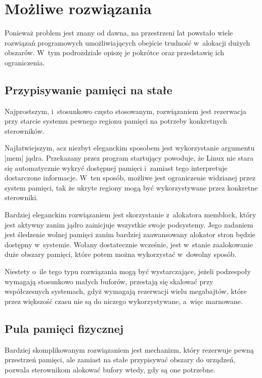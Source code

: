 \section{Możliwe rozwiązania}

Ponieważ problem jest znany od dawna, na przestrzeni lat powstało
wiele rozwiązań programowych umożliwiających obejście trudność
w~alokacji dużych obszarów.  W~tym podrozdziale opiszę je pokrótce
oraz przedstawię ich ograniczenia.

\subsection{Przypisywanie pamięci na stałe}

Najprostszym, i~stosunkowo często stosowanym, rozwiązaniem jest
rezerwacja przy starcie systemu pewnego regionu pamięci na potrzeby
konkretnych sterowników.

Najłatwiejszym, acz niezbyt eleganckim sposobem jest wykorzystanie
argumentu \code|mem| jądra.  Przekazany przez program startujący
powoduje, że Linux nie stara się automatycznie wykryć dostępnej
pamięci  i~zamiast tego interpretuje dostarczone informacje.
W~ten sposób, możliwe jest ograniczenie widzianej przez system
pamięci, tak że ukryte regiony mogą być wykorzystywane przez konkretne
sterowniki.

Bardziej eleganckim rozwiązaniem jest skorzystanie z~alokatora
memblock, który jest aktywny zanim jądro zainicjuje wszystkie swoje
podsystemy.  Jego zadaniem jest śledzenie wolnej pamięci zanim
bardziej zaawansowany alokator stron będzie dostępny w~systemie.
Wołany dostatecznie wcześnie, jest w~stanie zaalokowanie duże obszary
pamięci, które potem można wykorzystać w~dowolny sposób.

Niestety o~ile tego typu rozwiązania mogą być wystarczające, jeżeli
podzespoły wymagają stosunkowo małych buforów, przestają się skalować
przy współczesnych systemach, gdyż wymagają rezerwacji wielu
megabajtów, które przez większość czasu nie są do niczego
wykorzystywane, a~więc marnowane.

\subsection{Pula pamięci fizycznej}

Bardziej skomplikowanym rozwiązaniem jest mechanizm, który rezerwuje
pewną przestrzeń pamięci, ale zamiast na stałe przypisywać obszary do
urządzeń, pozwala sterownikom alokować bufory wtedy, gdy są one
potrzebne.

